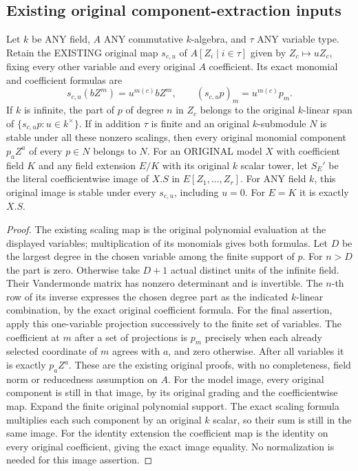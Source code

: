 \subsection{Existing original component-extraction inputs}

\begin{lemma}
\label{lem:actual-multigraded-torus-component-extraction}
\leanok
{}
Let $k$ be ANY field, $A$ ANY commutative $k$-algebra, and
$\tau$ ANY variable type. Retain the EXISTING original map
$s_{c,u}$ of $A[Z_i\mid i\in\tau]$ given by $Z_c\mapsto uZ_c$,
fixing every other variable and every original $A$ coefficient.
Its exact monomial and coefficient formulas are
\[
 s_{c,u}(bZ^m)=u^{m(c)}bZ^m,\qquad
 (s_{c,u}p)_m=u^{m(c)}p_m.
\]
If $k$ is infinite, the part of $p$ of degree $n$ in $Z_c$ belongs to the original
$k$-linear span of $\{s_{c,u}p:u\in k^\times\}$.
If in addition $\tau$ is finite and an original $k$-submodule $N$ is stable under all these nonzero
scalings, then every original monomial component $p_aZ^a$ of every
$p\in N$ belongs to $N$.
For an ORIGINAL model $X$ with coefficient field $K$ and any field
extension $E/K$ with its original $k$ scalar tower, let $S_E'$ be the
literal coefficientwise image of $X.S$ in $E[Z_1,\ldots,Z_r]$.
For ANY field $k$, this original image is stable under every
$s_{c,u}$, including $u=0$. For $E=K$ it is exactly $X.S$.
\end{lemma}
\begin{proof}
The existing scaling map is the original polynomial evaluation at
the displayed variables; multiplication of its monomials gives both
formulas. Let $D$ be the largest degree in the chosen variable among
the finite support of $p$. For $n>D$ the part is zero. Otherwise take
$D+1$ actual distinct units of the infinite field. Their Vandermonde
matrix has nonzero determinant and is invertible. The $n$-th row of
its inverse expresses the chosen degree part as the indicated
$k$-linear combination, by the exact original coefficient formula.
For the final assertion, apply this one-variable projection
successively to the finite set of variables. The coefficient at
$m$ after a set of projections is $p_m$ precisely when each already
selected coordinate of $m$ agrees with $a$, and zero otherwise.
After all variables it is exactly $p_aZ^a$. These are the existing
original proofs, with no completeness, field norm or reducedness
assumption on $A$.
For the model image, every original component is still in that image,
by its original grading and the coefficientwise map. Expand the finite
original polynomial support. The exact scaling formula multiplies
each such component by an original $k$ scalar, so their sum is still
in the same image. For the identity extension the coefficient map is
the identity on every original coefficient, giving the exact image
equality. No normalization is needed for this image assertion.
\end{proof}

